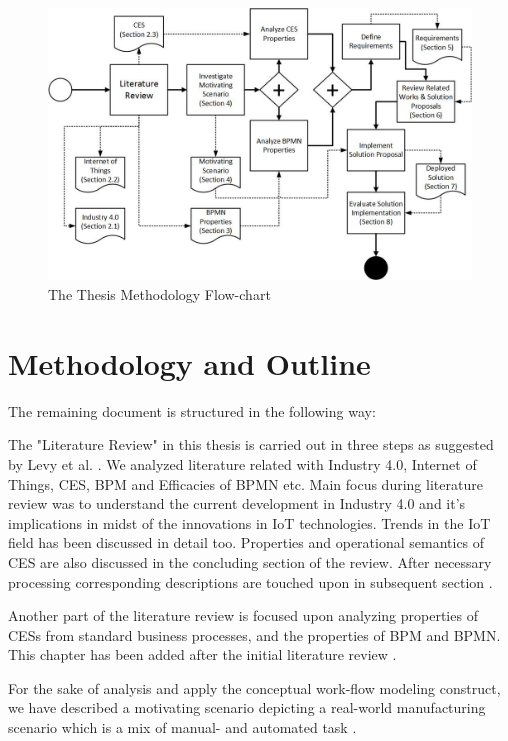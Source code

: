 \begin{figure}[h!]
	\includegraphics[scale=0.73, angle=90]{./gfx/outline}
	\centering
	\caption{The Thesis Methodology Flow-chart}
	\label{fig:1.3}
\end{figure}
\section{Methodology and Outline}
The remaining document is structured in the following way:

The "Literature Review" in this thesis is carried out in three steps as suggested by Levy et al. \cite{LEVYLIT}. We analyzed literature related with Industry 4.0, Internet of Things, \acs{CES}, \acs{BPM} and Efficacies of \acs{BPMN} etc. Main focus during literature review was to understand the current development in Industry 4.0 and it's implications in midst of the innovations in \acs{IoT} technologies. Trends in the \acs{IoT} field has been discussed in detail too. Properties and operational semantics of \acs{CES} are also discussed in the concluding section of the review. After necessary processing corresponding descriptions are touched upon in subsequent section .
  
Another part of the literature review is focused upon analyzing properties of \acs{CES}s from standard business processes, and the properties of \acs{BPM} and \acs{BPMN}. This chapter has been added after the initial literature review . 

For the sake of analysis and apply the conceptual work-flow modeling construct, we have described a motivating scenario depicting a real-world manufacturing scenario which is a mix of manual- and automated task .

